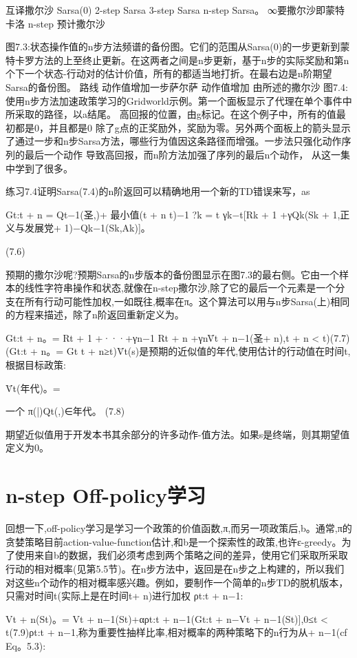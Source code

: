 互译撒尔沙
Sarsa(0) 2-step Sarsa 3-step Sarsa n-step Sarsa。
∞要撒尔沙即蒙特卡洛
n-step
预计撒尔沙
 

图7.3:状态操作值的n步方法频谱的备份图。它们的范围从Sarsa(0)的一步更新到蒙特卡罗方法的上至终止更新。在这两者之间是n步更新，基于n步的实际奖励和第n个下一个状态-行动对的估计价值，所有的都适当地打折。在最右边是n阶期望Sarsa的备份图。
路线
动作值增加一步萨尔萨
动作值增加
由所述的撒尔沙
图7.4:使用n步方法加速政策学习的Gridworld示例。第一个面板显示了代理在单个事件中所采取的路径，以a结尾。
高回报的位置，由g标记。在这个例子中，所有的值最初都是0，并且都是0
除了g点的正奖励外，奖励为零。另外两个面板上的箭头显示了通过一步和n步Sarsa方法，哪些行为值因这条路径而增强。一步法只强化动作序列的最后一个动作
导致高回报，而n阶方法加强了序列的最后n个动作，
从这一集中学到了很多。

练习7.4证明Sarsa(7.4)的n阶返回可以精确地用一个新的TD错误来写，as


Gt:t + n = Qt−1(圣,)+
最小值(t + n t)−1 ?k = t
γk−t[Rk + 1 +γQk(Sk + 1,正义与发展党+ 1)−Qk−1(Sk,Ak)]。

(7.6)

预期的撒尔沙呢?预期Sarsa的n步版本的备份图显示在图7.3的最右侧。它由一个样本的线性字符串操作和状态,就像在n-step撒尔沙,除了它的最后一个元素是一个分支在所有行动可能性加权,一如既往,概率在π。这个算法可以用与n步Sarsa(上)相同的方程来描述，除了n阶返回重新定义为。

Gt:t + n。= Rt + 1 +···+γn−1 Rt + n +γnV̄t + n−1(圣+ n),t + n < t)(7.7)(Gt:t + n。= Gt t + n≥t)V̄t(s)是预期的近似值的年代,使用估计的行动值在时间t,根据目标政策:

V̄t(年代)。=

一个
π(|)Qt(,)∈年代。 					(7.8)

期望近似值用于开发本书其余部分的许多动作-值方法。如果s是终端，则其期望值定义为0。


\section{n-step Off-policy学习}

回想一下,off-policy学习是学习一个政策的价值函数,π,而另一项政策后,b。通常,π的贪婪策略目前action-value-function估计,和b是一个探索性的政策,也许ε-greedy。为了使用来自b的数据，我们必须考虑到两个策略之间的差异，使用它们采取所采取行动的相对概率(见第5.5节)。在n步方法中，返回是在n步之上构建的，所以我们对这些n个动作的相对概率感兴趣。例如，要制作一个简单的n步TD的脱机版本，只需对时间t(实际上是在时间t+ n)进行加权
ρt:t + n−1:

Vt + n(St)。= Vt + n−1(St)+αρt:t + n−1(Gt:t + n−Vt + n−1(St)],0≤t < t(7.9)ρt:t + n−1,称为重要性抽样比率,相对概率的两种策略下的n行为从+ n−1(cf Eq。5.3):

